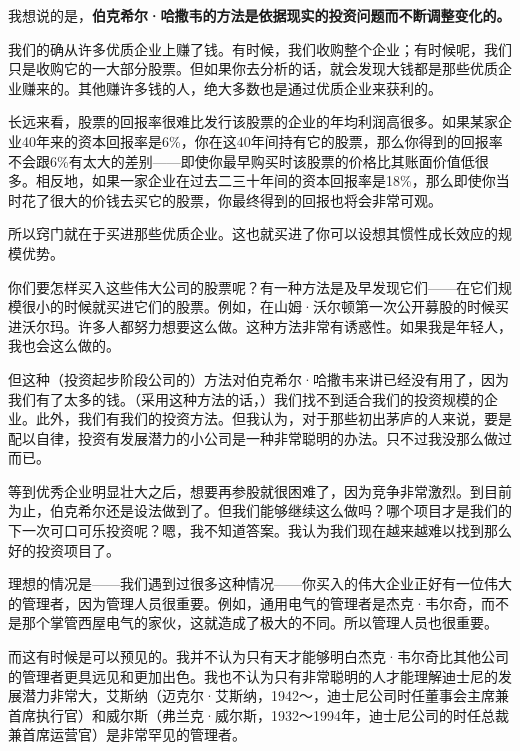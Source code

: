 我想说的是，\textbf{伯克希尔·哈撒韦的方法是依据现实的投资问题而不断调整变化的。}
\par

我们的确从许多优质企业上赚了钱。有时候，我们收购整个企业；有时候呢，我们只是收购它的一大部分股票。但如果你去分析的话，就会发现大钱都是那些优质企业赚来的。其他赚许多钱的人，绝大多数也是通过优质企业来获利的。
\par

长远来看，股票的回报率很难比发行该股票的企业的年均利润高很多。如果某家企业40年来的资本回报率是6\%，你在这40年间持有它的股票，那么你得到的回报率不会跟6\%有太大的差别——即使你最早购买时该股票的价格比其账面价值低很多。相反地，如果一家企业在过去二三十年间的资本回报率是18\%，那么即使你当时花了很大的价钱去买它的股票，你最终得到的回报也将会非常可观。
\par

所以窍门就在于买进那些优质企业。这也就买进了你可以设想其惯性成长效应的规模优势。
\par

你们要怎样买入这些伟大公司的股票呢？有一种方法是及早发现它们——在它们规模很小的时候就买进它们的股票。例如，在山姆·沃尔顿第一次公开募股的时候买进沃尔玛。许多人都努力想要这么做。这种方法非常有诱惑性。如果我是年轻人，我也会这么做的。
\par

但这种（投资起步阶段公司的）方法对伯克希尔·哈撒韦来讲已经没有用了，因为我们有了太多的钱。（采用这种方法的话，）我们找不到适合我们的投资规模的企业。此外，我们有我们的投资方法。但我认为，对于那些初出茅庐的人来说，要是配以自律，投资有发展潜力的小公司是一种非常聪明的办法。只不过我没那么做过而已。
\par

等到优秀企业明显壮大之后，想要再参股就很困难了，因为竞争非常激烈。到目前为止，伯克希尔还是设法做到了。但我们能够继续这么做吗？哪个项目才是我们的下一次可口可乐投资呢？嗯，我不知道答案。我认为我们现在越来越难以找到那么好的投资项目了。
\par

理想的情况是——我们遇到过很多这种情况——你买入的伟大企业正好有一位伟大的管理者，因为管理人员很重要。例如，通用电气的管理者是杰克·韦尔奇，而不是那个掌管西屋电气的家伙，这就造成了极大的不同。所以管理人员也很重要。
\par

而这有时候是可以预见的。我并不认为只有天才能够明白杰克·韦尔奇比其他公司的管理者更具远见和更加出色。我也不认为只有非常聪明的人才能理解迪士尼的发展潜力非常大，艾斯纳（迈克尔·艾斯纳，1942～，迪士尼公司时任董事会主席兼首席执行官）和威尔斯（弗兰克·威尔斯，1932～1994年，迪士尼公司的时任总裁兼首席运营官）是非常罕见的管理者。
\par


